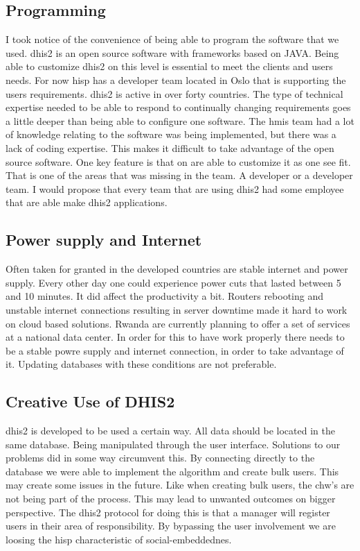 \subsection{Programming}
I took notice of the convenience of being able to program the software that we used.
\gls{dhis2} is an open source software with frameworks based on JAVA. 
Being able to customize \gls{dhis2} on this level is essential to meet the clients and users needs.
For now \gls{hisp} has a developer team located in Oslo that is supporting the users requirements.
\gls{dhis2} is active in over forty countries. 
The type of technical expertise needed to be able to respond to continually changing requirements goes a little deeper than being able to configure one software. 
The \gls{hmis} team had a lot of knowledge relating to the software was being implemented, but there was a lack of coding expertise.
This makes it difficult to take advantage of the open source software. 
One key feature is that on are able to customize it as one see fit. 
That is one of the areas that was missing in the team. A developer or a developer team.
I would propose that every team that are using \gls{dhis2} had some employee that are able make  \gls{dhis2} applications.

\subsection{Power supply and Internet}
Often taken for granted in the developed countries are stable internet and power supply.
Every other day one could experience power cuts that lasted between 5 and  10 minutes.
It did affect the productivity a bit. 
Routers rebooting and unstable internet connections resulting in server downtime made it hard to work on cloud based solutions. 
Rwanda are currently planning to offer a set of services at a national data center.
In order for this to have work properly there needs to be a stable powre supply and internet connection, in order to take advantage of it.
Updating databases with these conditions are not preferable. 

\subsection{Creative Use of DHIS2}
\gls{dhis2} is developed to be used a certain way. 
All data should be located in the same database. 
Being manipulated through the user interface.
Solutions to our problems did in some way circumvent this.
By connecting directly to the database we were able to implement the algorithm and create bulk users.
This may create some issues in the future.
Like when creating bulk users, the \gls{chw}'s are not being part of the process. 
This may lead to unwanted outcomes on bigger perspective.
The \gls{dhis2} protocol for doing this is that a manager will register users in their area of responsibility.
By bypassing the user involvement we are loosing the \gls{hisp} characteristic of social-embeddednes. 


